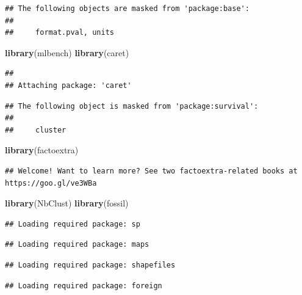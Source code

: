 \documentclass[]{article}
\newenvironment{Shaded}{\begin{snugshade}}{\end{snugshade}}
\newcommand{\KeywordTok}[1]{\textcolor[rgb]{0.13,0.29,0.53}{\textbf{#1}}}
\newcommand{\NormalTok}[1]{#1}
\begin{document}
\begin{verbatim}
## The following objects are masked from 'package:base':
## 
##     format.pval, units
\end{verbatim}

\begin{Shaded}
\begin{Highlighting}[]
\KeywordTok{library}\NormalTok{(mlbench)}
\KeywordTok{library}\NormalTok{(caret)}
\end{Highlighting}
\end{Shaded}

\begin{verbatim}
## 
## Attaching package: 'caret'
\end{verbatim}

\begin{verbatim}
## The following object is masked from 'package:survival':
## 
##     cluster
\end{verbatim}

\begin{Shaded}
\begin{Highlighting}[]
\KeywordTok{library}\NormalTok{(factoextra)}
\end{Highlighting}
\end{Shaded}

\begin{verbatim}
## Welcome! Want to learn more? See two factoextra-related books at https://goo.gl/ve3WBa
\end{verbatim}

\begin{Shaded}
\begin{Highlighting}[]
\KeywordTok{library}\NormalTok{(NbClust)}
\KeywordTok{library}\NormalTok{(fossil)}
\end{Highlighting}
\end{Shaded}

\begin{verbatim}
## Loading required package: sp
\end{verbatim}

\begin{verbatim}
## Loading required package: maps
\end{verbatim}

\begin{verbatim}
## Loading required package: shapefiles
\end{verbatim}

\begin{verbatim}
## Loading required package: foreign
\end{verbatim}
\end{document}
